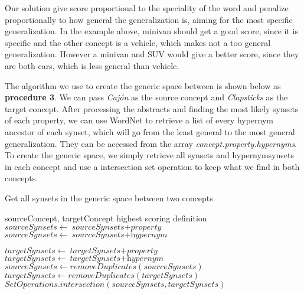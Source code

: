 Our solution give score proportional to the speciality of the word and penalize proportionally to how general the generalization is, aiming for the most specific generalization. In the example above, minivan should get a good score, since it is specific and the other concept is a vehicle, which makes not a too general generalization. However a minivan and SUV would give a better score, since they are both cars, which is less general than vehicle.

The algorithm we use to create the generic space between is shown below as \textbf{procedure 3}. We can pass \emph{Cajón} as the source concept and \emph{Clapsticks} as the target concept. After processing the abstracts and finding the most likely synsets of each property, we can use WordNet to retrieve a list of every hypernym ancestor of each synset, which will go from the least general to the most general generalization. They can be accessed from the array \emph{concept.property.hypernyms}. To create the generic space, we simply retrieve all synsets and hypernymsynsets in each concept and use a intersection set operation to keep what we find in both concepts.

\begin{algorithm}
	\caption{Get all synsets in the generic space between two concepts}\label{euclid}
	\begin{algorithmic}[1]
		\Require sourceConcept,
		targetConcept
		\Ensure highest scoring definition
		\State ${\textit{sourceSynsets} \gets {\textit{sourceSynsets} + \textit{property}}}$
		\State ${\textit{sourceSynsets} \gets {\textit{sourceSynsets} + \textit{hypernym}}}$
		\EndFor
		\EndFor
		
		\State ${\textit{targetSynsets} \gets {\textit{targetSynsets} + \textit{property}}}$
		\State ${\textit{targetSynsets} \gets {\textit{targetSynsets} + \textit{hypernym}}}$
		\EndFor
		\EndFor
		\State ${\textit{sourceSynsets} \gets {removeDuplicates(\textit{sourceSynsets})}}$
		\State ${\textit{targetSynsets} \gets {removeDuplicates(\textit{targetSynsets})}}$
		\State \Return ${SetOperations.intersection(\textit{sourceSynsets}, \textit{targetSynsets})}$
		\EndProcedure
	\end{algorithmic}
\end{algorithm}

